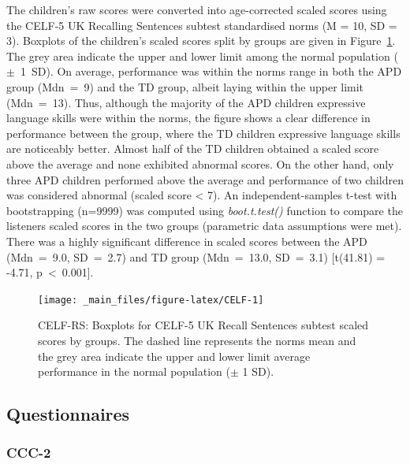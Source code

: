 \documentclass[a4paper, twoside]{templates/ociamthesis}
\begin{document}
The children's raw scores were converted into age-corrected scaled scores using the CELF-5 UK Recalling Sentences subtest standardised norms (M = 10, SD = 3). Boxplots of the children's scaled scores split by groups are given in Figure~\ref{fig:CELF}. The grey area indicate the upper and lower limit among the normal population (\(\pm\)~1~SD). On average, performance was within the norms range in both the APD group (Mdn~=~9) and the TD group, albeit laying within the upper limit (Mdn~=~13). Thus, although the majority of the APD children expressive language skills were within the norms, the figure shows a clear difference in performance between the group, where the TD children expressive language skills are noticeably better. Almost half of the TD children obtained a scaled score above the average and none exhibited abnormal scores. On the other hand, only three APD children performed above the average and performance of two children was considered abnormal (scaled score \textless{} 7). An independent-samples t-test with bootstrapping (n=9999) was computed using \emph{boot.t.test()} function \autocite[MKinfer package;][]{MKinferPackageR} to compare the listeners scaled scores in the two groups (parametric data assumptions were met). There was a highly significant difference in scaled scores between the APD (Mdn~=~9.0, SD~=~2.7) and TD group (Mdn~=~13.0, SD~=~3.1) {[}t(41.81) = -4.71, p~\textless~0.001{]}.\\

\begin{figure}

{\centering \texttt{[image: \_main\_files/figure-latex/CELF-1]} 

}

\caption{CELF-RS: Boxplots for CELF-5 UK Recall Sentences subtest scaled scores by groups. The dashed line represents the norms mean and the grey area indicate the upper and lower limit average performance in the normal population ($\pm$ 1 SD).}\label{fig:CELF}
\end{figure}

\hypertarget{questionnaires-1}{%
\subsection{Questionnaires}\label{questionnaires-1}}

\hypertarget{ccc-2}{%
\subsubsection{CCC-2}\label{ccc-2}}
\end{document}
